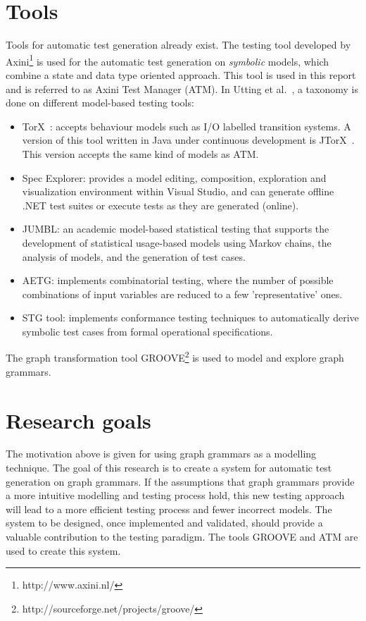 \section{Tools}
Tools for automatic test generation already exist. The testing tool developed by Axini\footnote{http://www.axini.nl/} is used for the automatic test generation on \textit{symbolic} models, which combine a state and data type oriented approach. This tool is used in this report and is referred to as Axini Test Manager (ATM). In Utting et al.~\cite{Utting:MBTTaxonomy}, a taxonomy is done on different model-based testing tools:
\begin{itemize}
  \item TorX~\cite{Tretmans:TorX}: accepts behaviour models such as I/O labelled transition systems. A version of this tool written in Java under continuous development is JTorX~\cite{Belinfante:JTorX}. This version accepts the same kind of models as ATM.
  \item Spec Explorer\cite{Veanes:SpecExplorer}: provides a model editing, composition, exploration and visualization environment within Visual Studio, and can generate offline .NET test suites or execute tests as they are generated (online).
  \item JUMBL\cite{Prowell:JUMBL}: an academic model-based statistical testing that supports the development of statistical usage-based models using Markov chains, the analysis of models, and the generation of test cases.
  \item AETG\cite{Cohen:AETG}: implements combinatorial testing, where the number of possible combinations of input variables are reduced to a few 'representative' ones.
  \item STG tool\cite{clarke:STG}: implements conformance testing techniques to automatically derive symbolic test cases from formal operational specifications.
\end{itemize}

The graph transformation tool GROOVE\footnote{http://sourceforge.net/projects/groove/} is used to model and explore graph grammars.

\section{Research goals}\label{sec:goals}
The motivation above is given for using graph grammars as a modelling technique. The goal of this research is to create a system for automatic test generation on graph grammars. If the assumptions that graph grammars provide a more intuitive modelling and testing process hold, this new testing approach will lead to a more efficient testing process and fewer incorrect models. The system to be designed, once implemented and validated, should provide a valuable contribution to the testing paradigm. The tools GROOVE and ATM are used to create this system.

